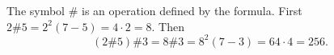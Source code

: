 The symbol $\#$ is an operation defined by the formula. First $2\#5=2^2(7-5)=4\cdot2=8$. Then
\[
(2\#5)\#3=8\#3=8^2(7-3)=64\cdot4=\boxed{256}.
\]
